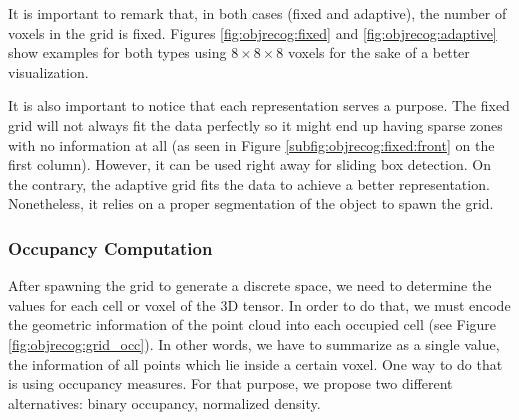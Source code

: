 It is important to remark that, in both cases (fixed and adaptive), the number of voxels in the grid is fixed. Figures \ref{fig:objrecog:fixed} and \ref{fig:objrecog:adaptive} show examples for both types using $8\times8\times8$ voxels for the sake of a better visualization.

It is also important to notice that each representation serves a purpose. The fixed grid will not always fit the data perfectly so it might end up having sparse zones with no information at all (as seen in Figure \ref{subfig:objrecog:fixed:front} on the first column). However, it can be used right away for sliding box detection. On the contrary, the adaptive grid fits the data to achieve a better representation. Nonetheless, it relies on a proper segmentation of the object to spawn the grid.

\subsubsection{Occupancy Computation}
\label{cha:objrecog:sec:study:subsec:representation:subsubsec:occupancy}

After spawning the grid to generate a discrete space, we need to determine the values for each cell or voxel of the \acs{3D} tensor. In order to do that, we must encode the geometric information of the point cloud into each occupied cell (see Figure \ref{fig:objrecog:grid_occ}). In other words, we have to summarize as a single value, the information of all points which lie inside a certain voxel. One way to do that is using occupancy measures. For that purpose, we propose two different alternatives: binary occupancy, normalized density.

